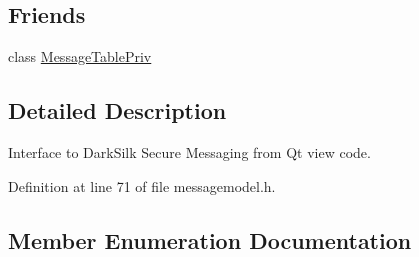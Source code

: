 \subsection*{Friends}
\begin{DoxyCompactItemize}
\item 
class \hyperlink{class_message_model_a5c879241490f0146eae8b49e54d610ac}{Message\+Table\+Priv}
\end{DoxyCompactItemize}


\subsection{Detailed Description}
Interface to Dark\+Silk Secure Messaging from Qt view code. 

Definition at line 71 of file messagemodel.\+h.



\subsection{Member Enumeration Documentation}
\hypertarget{class_message_model_a06abed7ec66ac487a58ca87fd84e2053}{}
